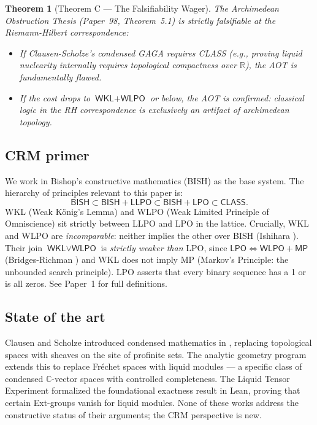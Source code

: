 \documentclass[11pt,a4paper]{article}
\theoremstyle{plain}
\newtheorem{theorem}{Theorem}[section]
\theoremstyle{definition}
\newcommand{\BISH}{\textsf{BISH}}
\newcommand{\WKL}{\textsf{WKL}}
\newcommand{\WLPO}{\textsf{WLPO}}
\newcommand{\LLPO}{\textsf{LLPO}}
\newcommand{\LPO}{\textsf{LPO}}
\newcommand{\MP}{\textsf{MP}}
\newcommand{\CLASS}{\textsf{CLASS}}
\newcommand{\CRM}{\textsf{CRM}}
\newcommand{\R}{\mathbb{R}}
\newcommand{\C}{\mathbb{C}}
\begin{document}
\begin{theorem}[Theorem C --- The Falsifiability Wager]\label{thm:falsifiability}
The Archimedean Obstruction Thesis (Paper~98, Theorem~5.1) is strictly falsifiable at the Riemann-Hilbert correspondence:
\begin{itemize}[nosep]
\item If Clausen-Scholze's condensed GAGA requires \CLASS{} (e.g., proving liquid nuclearity internally requires topological compactness over $\R$), the AOT is fundamentally flawed.
\item If the cost drops to $\WKL + \WLPO$ or below, the AOT is confirmed: classical logic in the RH correspondence is exclusively an artifact of archimedean topology.
\end{itemize}
\end{theorem}

\subsection{\CRM{} primer}

We work in Bishop's constructive mathematics (\BISH) as the base system.
The hierarchy of principles relevant to this paper is:
\[
\BISH \subset \BISH + \LLPO \subset \BISH + \LPO \subset \CLASS.
\]
\WKL{} (Weak König's Lemma) and \WLPO{} (Weak Limited Principle of Omniscience) sit strictly between \LLPO{} and \LPO{} in the lattice.
Crucially, \WKL{} and \WLPO{} are \emph{incomparable}: neither implies the other over \BISH{} (Ishihara \cite{Ishihara2006}).
Their join $\WKL \vee \WLPO$ is \emph{strictly weaker than} \LPO, since $\LPO \Leftrightarrow \WLPO + \MP$ (Bridges-Richman \cite{BridgesRichman1987}) and \WKL{} does not imply \MP{} (Markov's Principle: the unbounded search principle).
\LPO{} asserts that every binary sequence has a 1 or is all zeros.
See Paper~1 \cite{Paper1} for full definitions.

\subsection{State of the art}

Clausen and Scholze introduced condensed mathematics in \cite{ClausenScholze2020}, replacing topological spaces with sheaves on the site of profinite sets.
The analytic geometry program \cite{ClausenScholze2022} extends this to replace Fréchet spaces with liquid modules --- a specific class of condensed $\C$-vector spaces with controlled completeness.
The Liquid Tensor Experiment \cite{Commelin2022} formalized the foundational exactness result in Lean, proving that certain Ext-groups vanish for liquid modules.
None of these works address the constructive status of their arguments; the CRM perspective is new.
\end{document}
